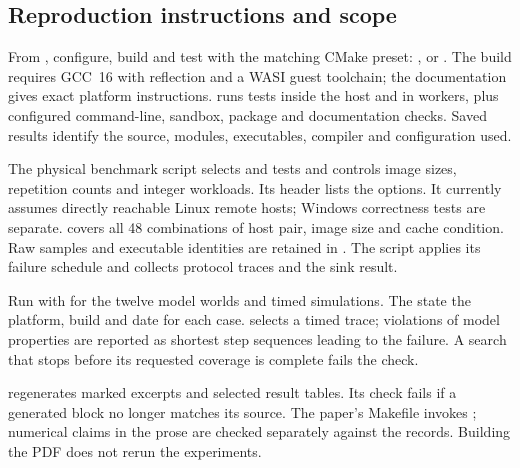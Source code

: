 \subsection{Reproduction instructions and scope}

From , configure, build and test with the matching CMake preset:
,  or .
The build requires GCC~16 with reflection and a WASI guest toolchain;
the documentation gives exact platform instructions.  runs
tests inside the host and in workers, plus configured command-line,
sandbox, package and documentation checks. Saved results identify the
source, modules, executables, compiler and configuration used.

The physical benchmark script selects  and  tests
and controls image sizes, repetition counts and integer workloads.
Its header lists the options. It currently assumes directly reachable
Linux remote hosts; Windows correctness tests are separate.
 covers all 48 combinations of host pair, image
size and cache condition. Raw samples and executable identities are
retained in .
The  script applies its failure schedule and
collects protocol traces and the sink result.

Run  with
 for the twelve model
worlds and timed simulations. The
state the platform, build and date for each case. 
selects a timed trace; violations of model properties are reported as
shortest step sequences leading to the failure. A search that stops
before its requested coverage is complete fails the check.

 regenerates marked excerpts and selected result
tables. Its check fails if a generated block no longer matches its source.
The paper's Makefile invokes ; numerical claims in the prose
are checked separately against the records. Building the PDF does not
rerun the experiments.
